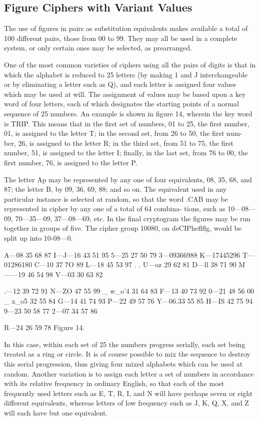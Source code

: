 \subsection{Figure Ciphers with Variant Values}

\mypara The use of ﬁgures in pairs as substitution equivalents makes available a total of 100 different pairs, those from 00 to 99. They may all
be used in a complete system, or only certain ones may be selected, as
prearranged.

\mypara One of the most common varieties of ciphers using all the pairs of
digits is that in which the alphabet is reduced to 25 letters (by making
1 and J interchangeable or by eliminating a letter such as Q), and each
letter is assigned four values which may be used at will. The assignment
of values may be based upon a key word of four letters, each of which
designates the starting points of a normal sequence of 25 numbers. An
example is shown in ﬁgure 14, wherein the key word is TRIP. This
means that in the ﬁrst set of numbers, 01 to 25, the ﬁrst number, 01, is
assigned to the letter T; in the second set, from 26 to 50, the ﬁrst num-
ber, 26, is assigned to the letter R; in the third set, from 51 to 75, the
ﬁrst number, 51, is assigned to the letter I; ﬁnally, in the last set, from
76 to 00, the ﬁrst number, 76, is assigned to the letter P.

The letter Ap may be represented by any one of four equivalents, 08,
35, 68, and 87; the letter B, by 09, 36, 69, 88; and so on. The equivalent
used in any particular instance is selected at random, so that the word
.CAB may be represented in cipher by any one of a total of 64 combina-
tions, such as 10—08—09, 70—35—09, 37—08—69, etc. In the ﬁnal cryptogram
the ﬁgures may be run together in groups of ﬁve. The cipher group
10080, on deCIPheﬂﬂg, would be split up into 10-08—0.

A—08 35 68 87 I—J—16 43 51 95 5—25 27 50 79
3—09366988 K—17445296 T—01286180
C—10 37 7O 89 L—18 45 53 97 . . U—oz 29 62 81
D—ll 38 71 90 M——19 46 54 98 V—03 30 63 82

.—12 39 72 91 N—ZO 47 55 99 _ w_o'4 31 64 83
F—13 40 73 92 0—21 48 56 00 _ x_o5 32 55 84
G—14 41 74 93 P—22 49 57 76 Y—06.33 55 85
H—IS 42 75 94 9—23 50 58 77 2—07 34 57 86

R—24 26 59 78
Figure 14.

\mypara In this case, within each set of 25 the numbers progress serially,
each set being treated as a ring or circle. It is of course possible to mix
the sequence to destroy this serial progression, thus giving four mixed
alphabets which can be used at random.
\mypara Another variation is to assign each letter a set of numbers in accordance with its relative frequency in ordinary English, so that each of
the most frequently used letters such as E, T, R, I, and N will have
perhaps seven or eight different equivalents, whereas letters of low frequency such as J, K, Q, X, and Z will each have but one equivalent.

